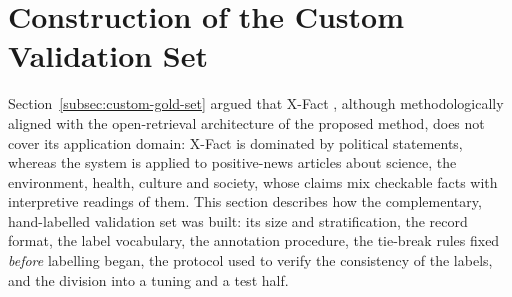 

\section{Construction of the Custom Validation Set}
\label{sec:custom-dataset}

Section~\ref{subsec:custom-gold-set} argued that X-Fact
\cite{gupta2021xfact}, although methodologically aligned with the
open-retrieval architecture of the proposed method, does not cover
its application domain: X-Fact is dominated by political statements,
whereas the system is applied to positive-news articles about
science, the environment, health, culture and society, whose claims
mix checkable facts with interpretive readings of them. This section
describes how the complementary, hand-labelled validation set was
built: its size and stratification, the record format, the label
vocabulary, the annotation procedure, the tie-break rules fixed
\emph{before} labelling began, the protocol used to verify the
consistency of the labels, and the division into a tuning and a test
half.



















